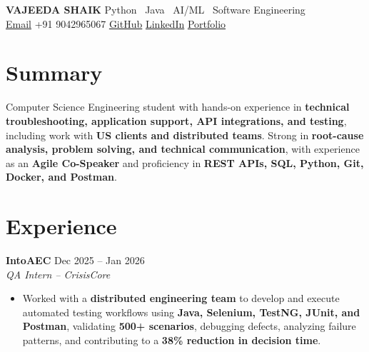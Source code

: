 \documentclass[12pt]{extarticle}
\begin{document}

\noindent
{\LARGE\textbf{VAJEEDA SHAIK}}
\hfill
Python \textbar\ Java \textbar\ AI/ML \textbar\ Software Engineering
\\[4pt]

\small
\faEnvelope\;
\href{mailto:vajeeda.mastan@gmail.com}{Email}
\quad\textbar\quad
\faPhone\; +91 9042965067
\quad\textbar\quad
\faGithub\;
\href{https://github.com/vajeedashaik}{GitHub}
\quad\textbar\quad
\faLinkedin\;
\href{https://www.linkedin.com/in/vajeeda-shaik-344774279}{LinkedIn}
\quad\textbar\quad
\faGlobe\;
\href{https://vajeedaportfolio.vercel.app}{Portfolio}

\normalsize


\section*{Summary}

Computer Science Engineering student with hands-on experience in
\textbf{technical troubleshooting, application support, API integrations,
and testing}, including work with \textbf{US clients and distributed teams}.
Strong in \textbf{root-cause analysis, problem solving, and technical
communication}, with experience as an \textbf{Agile Co-Speaker} and proficiency
in \textbf{REST APIs, SQL, Python, Git, Docker, and Postman}.


\section*{Experience}

\textbf{IntoAEC} \hfill Dec 2025 -- Jan 2026 \\
\textit{QA Intern -- CrisisCore}

\begin{itemize}
    \item Worked with a \textbf{distributed engineering team} to develop and execute
automated testing workflows using \textbf{Java, Selenium, TestNG, JUnit,
and Postman}, validating \textbf{500+ scenarios}, debugging defects,
analyzing failure patterns, and contributing to a \textbf{38\% reduction
in decision time}.
\end{itemize}

\vspace{4pt}
\end{document}
